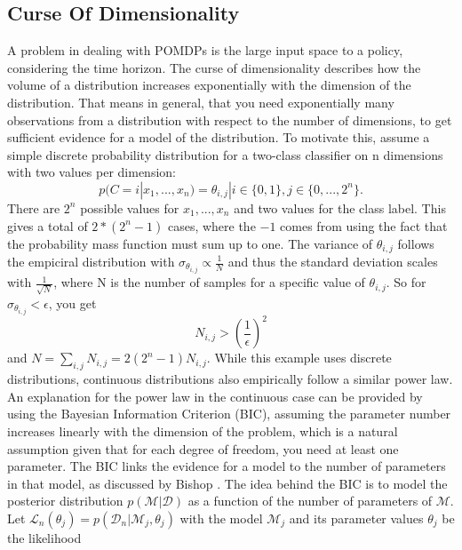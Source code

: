 \subsection{Curse Of Dimensionality}
\label{COD}
A problem in dealing with POMDPs is the large input space to a policy, considering the time horizon. 
The curse of dimensionality describes how the volume of a distribution increases exponentially with the dimension of the distribution. That means in general, 
that you need exponentially many observations from a distribution with respect to the number of dimensions, to get sufficient evidence for a model of the distribution. 
To motivate this, assume a simple 
discrete probability distribution for a two-class classifier on n dimensions with two values per dimension:
\begin{equation}
    p(C=i|x_1, ..., x_n)  = \theta_{i,j} | i \in \{0, 1\}, j \in \{0, ..., 2^n\}.
\end{equation}
There are $2^n$ possible values for $x_1, ..., x_n$ and two values for the class label. This gives a total of $2*(2^n-1)$ cases, where the $-1$ comes from using 
the fact that the probability mass function must sum up to one. The variance of $\theta_{i, j}$ follows the empiciral distribution 
with $\sigma_{\theta_{i,j}} \propto \frac{1}{N}$ and thus the standard deviation scales with $\frac{1}{\sqrt{N}}$, where N is the number of samples 
for a specific value of $\theta_{i,j}$. So for $\sigma_{\theta_{i,j}} < \epsilon$, you get
\begin{equation}
    N_{i,j} > \left(\frac{1}{\epsilon}\right)^2
\end{equation}
and $N = \sum_{i, j} N_{i, j} = 2 (2^n-1) N_{i,j}$. While this example uses discrete distributions, continuous distributions also empirically follow a similar 
power law.\\
An explanation for the power law in the continuous case can be provided by using the Bayesian Information Criterion (BIC), assuming the parameter number increases linearly with the dimension 
of the problem, which is a natural assumption given that for each degree of freedom, you need at least one parameter. 
The BIC links the evidence for a model to the number of parameters in that model, as discussed by Bishop \cite[chapter 4.4.1]{bishop}.
The idea behind the BIC is to model the posterior distribution $p(\mathcal{M}|\mathcal{D})$ as a function of the number of parameters of $\mathcal{M}$. 
Let $\mathcal{L}_n(\theta_j) = p(\mathcal{D}_n|\mathcal{M}_j, \theta_{j})$ with the model $\mathcal{M}_j$ and its parameter values $\theta_j$ be the likelihood 
